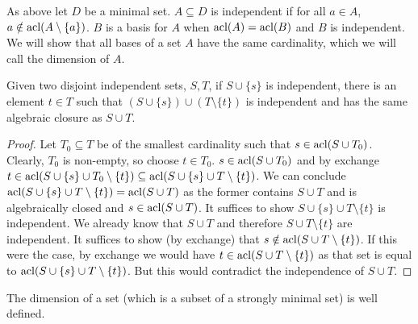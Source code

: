 \begin{definition}\label{definition_independence}
As above let \(D\) be a minimal set. \(A \subseteq D\) is independent if for all \(a \in A\), \(a \notin \text{acl}(A \setminus \{a\})\). 
\(B\) is a basis for \(A\) when \(\text{acl}(A) = \text{acl}(B)\) and \(B\) is independent.
We will show that all bases of a set \(A\)  have the same cardinality, which we will call the dimension of \(A\).
\end{definition}

\begin{lemma}\label{lemma_dimension}
Given two disjoint independent sets, \(S, T\), %
 if \(S \cup \{s\}\) is independent, there is an element \(t \in T\) such that \((S \cup \{s\}) \cup (T \setminus \{t\})\) is independent and has the same algebraic closure as \(S \cup T\). 
\end{lemma}

\begin{proof}
Let \(T_0 \subseteq T\) be of the smallest cardinality such that \(s \in \text{acl}(S \cup T_0)\). 
Clearly, \(T_0\) is non-empty, so choose \(t \in T_0\). 
\(s \in \text{acl}(S \cup T_0)\) and by exchange \(t \in \text{acl}(S \cup \{s\} \cup T_0 \setminus \{t\}) \subseteq \text{acl}(S \cup \{s\} \cup T \setminus \{t\})\).
We can conclude \(\text{acl}(S \cup \{s\} \cup T \setminus \{t\}) = \text{acl}(S \cup T)\) as the former contains \(S \cup T\) and is algebraically closed and \(s \in \text{acl}(S \cup T)\). 
It suffices to show \(S \cup \{s\} \cup T \setminus \{t\}\) is independent. 
We already know that \(S \cup T\) and therefore \(S \cup T \setminus \{t\}\) are independent. 
It suffices to show (by exchange) that \(s \notin \text{acl}(S \cup T \setminus \{t\})\).
If this were the case, by exchange we would have \(t \in \text{acl}(S \cup T \setminus \{t\})\) as that set is equal to \(\text{acl}(S \cup \{s\} \cup T \setminus\{t\})\).
But this would contradict the independence of \(S \cup T\). 
\end{proof}

\begin{theorem}\label{theorem_dimension}
The dimension of a set (which is a subset of a strongly minimal set) is well defined.
\end{theorem}

